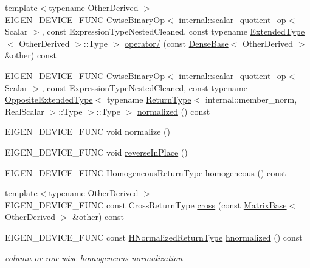 \begin{DoxyCompactItemize}
\item 
{\footnotesize template$<$typename Other\+Derived $>$ }\\E\+I\+G\+E\+N\+\_\+\+D\+E\+V\+I\+C\+E\+\_\+\+F\+U\+NC \mbox{\hyperlink{class_eigen_1_1_cwise_binary_op}{Cwise\+Binary\+Op}}$<$ \mbox{\hyperlink{struct_eigen_1_1internal_1_1scalar__quotient__op}{internal\+::scalar\+\_\+quotient\+\_\+op}}$<$ Scalar $>$, const Expression\+Type\+Nested\+Cleaned, const typename \mbox{\hyperlink{struct_eigen_1_1_vectorwise_op_1_1_extended_type}{Extended\+Type}}$<$ Other\+Derived $>$\+::Type $>$ \mbox{\hyperlink{class_eigen_1_1_vectorwise_op_ae36a76f1da78cb2ea74447c86ac68580}{operator/}} (const \mbox{\hyperlink{class_eigen_1_1_dense_base}{Dense\+Base}}$<$ Other\+Derived $>$ \&other) const
\item 
E\+I\+G\+E\+N\+\_\+\+D\+E\+V\+I\+C\+E\+\_\+\+F\+U\+NC \mbox{\hyperlink{class_eigen_1_1_cwise_binary_op}{Cwise\+Binary\+Op}}$<$ \mbox{\hyperlink{struct_eigen_1_1internal_1_1scalar__quotient__op}{internal\+::scalar\+\_\+quotient\+\_\+op}}$<$ Scalar $>$, const Expression\+Type\+Nested\+Cleaned, const typename \mbox{\hyperlink{struct_eigen_1_1_vectorwise_op_1_1_opposite_extended_type}{Opposite\+Extended\+Type}}$<$ typename \mbox{\hyperlink{struct_eigen_1_1_vectorwise_op_1_1_return_type}{Return\+Type}}$<$ internal\+::member\+\_\+norm, Real\+Scalar $>$\+::Type $>$\+::Type $>$ \mbox{\hyperlink{class_eigen_1_1_vectorwise_op_a38799c77ec92e4b856804b7f0bc35c67}{normalized}} () const
\item 
E\+I\+G\+E\+N\+\_\+\+D\+E\+V\+I\+C\+E\+\_\+\+F\+U\+NC void \mbox{\hyperlink{class_eigen_1_1_vectorwise_op_a1d22c9442537bd654edb4604db7b7b57}{normalize}} ()
\item 
E\+I\+G\+E\+N\+\_\+\+D\+E\+V\+I\+C\+E\+\_\+\+F\+U\+NC void \mbox{\hyperlink{class_eigen_1_1_vectorwise_op_ab9dd7c273eb2ba8defaab2d55156936b}{reverse\+In\+Place}} ()
\item 
E\+I\+G\+E\+N\+\_\+\+D\+E\+V\+I\+C\+E\+\_\+\+F\+U\+NC \mbox{\hyperlink{class_eigen_1_1_homogeneous}{Homogeneous\+Return\+Type}} \mbox{\hyperlink{group___geometry___module_ga7ae337c185a1de2343f12be4577c75fc}{homogeneous}} () const
\item 
{\footnotesize template$<$typename Other\+Derived $>$ }\\E\+I\+G\+E\+N\+\_\+\+D\+E\+V\+I\+C\+E\+\_\+\+F\+U\+NC const Cross\+Return\+Type \mbox{\hyperlink{group___geometry___module_gab3efae0c028a63a41cccb94d978d1437}{cross}} (const \mbox{\hyperlink{class_eigen_1_1_matrix_base}{Matrix\+Base}}$<$ Other\+Derived $>$ \&other) const
\item 
E\+I\+G\+E\+N\+\_\+\+D\+E\+V\+I\+C\+E\+\_\+\+F\+U\+NC const \mbox{\hyperlink{class_eigen_1_1_cwise_binary_op}{H\+Normalized\+Return\+Type}} \mbox{\hyperlink{group___geometry___module_ga8d3b6f7178b905b0e4418fd4900c4463}{hnormalized}} () const
\begin{DoxyCompactList}\small\item\em column or row-\/wise homogeneous normalization \end{DoxyCompactList}\end{DoxyCompactItemize}
